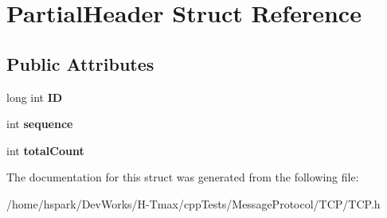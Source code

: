 \hypertarget{structPartialHeader}{\section{Partial\-Header Struct Reference}
\label{structPartialHeader}
}
\subsection*{Public Attributes}
\begin{DoxyCompactItemize}
\item 
\hypertarget{structPartialHeader_a4b574e6aefd1eafc6f07be34787d5bd1}{long int {\bfseries I\-D}}\label{structPartialHeader_a4b574e6aefd1eafc6f07be34787d5bd1}

\item 
\hypertarget{structPartialHeader_a90cad17b14ba56d0ad33d5f34f548efe}{int {\bfseries sequence}}\label{structPartialHeader_a90cad17b14ba56d0ad33d5f34f548efe}

\item 
\hypertarget{structPartialHeader_acf3c2b2bb3e7a05992c6e9a54892df89}{int {\bfseries total\-Count}}\label{structPartialHeader_acf3c2b2bb3e7a05992c6e9a54892df89}

\end{DoxyCompactItemize}


The documentation for this struct was generated from the following file\-:\begin{DoxyCompactItemize}
\item 
/home/hspark/\-Dev\-Works/\-H-\/\-Tmax/cpp\-Tests/\-Message\-Protocol/\-T\-C\-P/T\-C\-P.\-h\end{DoxyCompactItemize}
